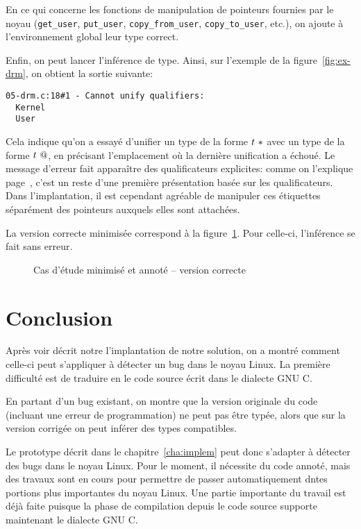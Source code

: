 En ce qui concerne les fonctions de manipulation de pointeurs fournies
par le noyau (\texttt{get\_user}, \texttt{put\_user},
\texttt{copy\_from\_user}, \texttt{copy\_to\_user}, etc.), on ajoute à
l'environnement global leur type correct.

Enfin, on peut lancer l'inférence de type. Ainsi, sur l'exemple de la
figure~\ref{fig:ex-drm}, on obtient la sortie suivante:

\begin{Verbatim}
05-drm.c:18#1 - Cannot unify qualifiers:
  Kernel
  User
\end{Verbatim}

Cela indique qu'on a essayé d'unifier un type de la forme $t~*$ avec un
type de la forme $t~@$, en précisant l'emplacement où la dernière
unification a échoué. Le message d'erreur fait apparaître des qualificateurs
explicites: comme on l'explique page~\pageref{page:qualifs-pas-qualifs}, c'est
un reste d'une première présentation basée sur les qualificateurs.
Dans l'implantation, il est cependant agréable de manipuler ces étiquettes
séparément des pointeurs auxquels elles sont attachées.

La version correcte minimisée correspond à la figure~\ref{fig:ex-drm-ok}. Pour
celle-ci, l'inférence se fait sans erreur.


\begin{figure}


    \caption{Cas d'étude minimisé et annoté -- version correcte}
    \label{fig:ex-drm-ok}

\end{figure}

\section*{Conclusion}

Après voir décrit notre l'implantation de notre solution, on a montré comment
celle-ci peut s'appliquer à détecter un bug dans le noyau Linux. La première
difficulté est de traduire en \newspeak le code source écrit dans le dialecte
GNU C.

En partant d'un bug existant, on montre que la version originale du code
(incluant une erreur de programmation) ne peut pas être typée, alors que sur la
version corrigée on peut inférer des types compatibles.

Le prototype décrit dans le chapitre~\ref{cha:implem} peut donc s'adapter à
détecter des bugs dans le noyau Linux. Pour le moment, il nécessite du code
annoté, mais des travaux sont en cours pour permettre de passer automatiquement
dntes portions plus importantes du noyau Linux. Une partie importante du travail
est déjà faite puisque la phase de compilation depuis le code source supporte
maintenant le dialecte GNU C.

